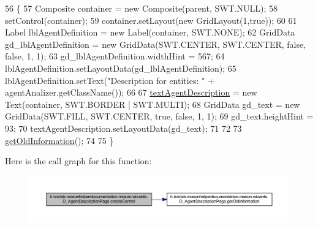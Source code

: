 \begin{DoxyCode}
56                                                 \{
57         Composite container = \textcolor{keyword}{new} Composite(parent, SWT.NULL);
58         setControl(container);
59         container.setLayout(\textcolor{keyword}{new} GridLayout(1,\textcolor{keyword}{true}));
60         
61         Label lblAgentDefinition = \textcolor{keyword}{new} Label(container, SWT.NONE);
62         GridData gd\_lblAgentDefinition = \textcolor{keyword}{new} GridData(SWT.CENTER, SWT.CENTER, \textcolor{keyword}{false}, \textcolor{keyword}{false}, 1, 1);
63         gd\_lblAgentDefinition.widthHint = 567;
64         lblAgentDefinition.setLayoutData(gd\_lblAgentDefinition);
65         lblAgentDefinition.setText(\textcolor{stringliteral}{"Description for entities: "} + agentAnalizer.getClassName());
66 
67         \hyperlink{classit_1_1isislab_1_1masonhelperdocumentation_1_1mason_1_1wizards_1_1_d___agent_description_page_adeaf5a5649c9280ceb38690357c70a1b}{textAgentDescription} = \textcolor{keyword}{new} Text(container, SWT.BORDER | SWT.MULTI);
68         GridData gd\_text = \textcolor{keyword}{new} GridData(SWT.FILL, SWT.CENTER, \textcolor{keyword}{true}, \textcolor{keyword}{false}, 1, 1);
69         gd\_text.heightHint = 93;
70         textAgentDescription.setLayoutData(gd\_text);
71 
72         
73         \hyperlink{classit_1_1isislab_1_1masonhelperdocumentation_1_1mason_1_1wizards_1_1_d___agent_description_page_aa774dfe04837b0b796d9e292aa3935be}{getOldInformation}();
74         
75     \}
\end{DoxyCode}


Here is the call graph for this function\-:\nopagebreak
\begin{figure}[H]
\begin{center}
\leavevmode
\includegraphics[width=350pt]{classit_1_1isislab_1_1masonhelperdocumentation_1_1mason_1_1wizards_1_1_d___agent_description_page_a54ede11092f7bd9db6cc381862180450_cgraph}
\end{center}
\end{figure}


